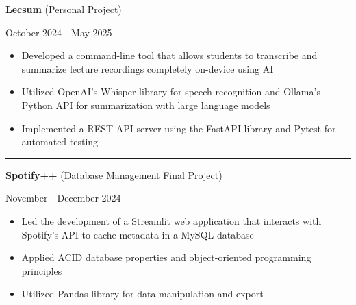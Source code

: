 \documentclass[letter]{article}
\begin{document}
    \noindent
    \begin{minipage}[c]{0.7\linewidth}
        \noindent \textbf{Lecsum} (Personal Project)
    \end{minipage}
    \begin{minipage}[c]{0.291\linewidth}
        \begin{flushright}
            October 2024 - May 2025
        \end{flushright}
    \end{minipage}
    \noindent
    \begin{itemize}[noitemsep, topsep=0pt]
        \item Developed a command-line tool that allows students to transcribe and summarize lecture recordings completely on-device using AI
        \item Utilized OpenAI's Whisper library for speech recognition and Ollama's Python API for summarization with large language models
        \item Implemented a REST API server using the FastAPI library and Pytest for automated testing
    \end{itemize}
    \medskip
    
    \hrule
    \vspace{4pt}
    \noindent
    \begin{minipage}[c]{0.7\linewidth}
        \noindent \textbf{Spotify++} (Database Management Final Project)
    \end{minipage}
    \begin{minipage}[c]{0.291\linewidth}
        \begin{flushright}
            November - December 2024
        \end{flushright}
    \end{minipage}
    \noindent
    \begin{itemize}[noitemsep, topsep=0pt]
        \item Led the development of a Streamlit web application that interacts with Spotify's API to cache metadata in a MySQL database
        \item Applied ACID database properties and object-oriented programming principles
        \item Utilized Pandas library for data manipulation and export
    \end{itemize}
    \medskip
\end{document}
